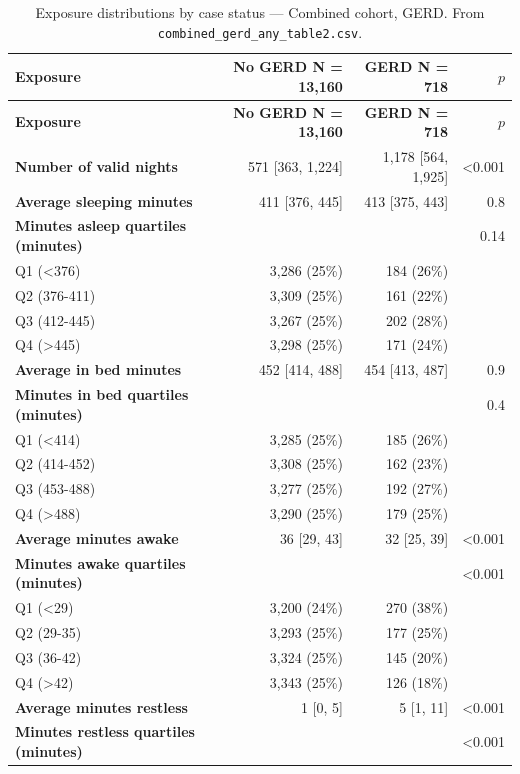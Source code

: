 \documentclass[11pt]{article}
\newcommand{\code}[1]{\texttt{\small #1}}
\begin{document}
\footnotesize\begin{longtable}{@{}p{6.4cm}rrr@{}}
\caption{Exposure distributions by case status --- Combined cohort, GERD. From \code{combined\_gerd\_any\_table2.csv}.}\label{tab:appM-t2-combined-gerd-any}\\
\toprule \textbf{Exposure} & \textbf{No GERD     N = 13,160} & \textbf{GERD     N = 718} & \textbf{$p$} \\ \midrule \endfirsthead
\toprule \textbf{Exposure} & \textbf{No GERD     N = 13,160} & \textbf{GERD     N = 718} & \textbf{$p$} \\ \midrule \endhead
\textbf{Number of valid nights} & 571 [363, 1,224] & 1,178 [564, 1,925] & <0.001 \\
\textbf{Average sleeping minutes} & 411 [376, 445] & 413 [375, 443] & 0.8 \\
\textbf{Minutes asleep quartiles (minutes)} &  &  & 0.14 \\
\quad Q1 (<376) & 3,286 (25\%) & 184 (26\%) &  \\
\quad Q2 (376-411) & 3,309 (25\%) & 161 (22\%) &  \\
\quad Q3 (412-445) & 3,267 (25\%) & 202 (28\%) &  \\
\quad Q4 (>445) & 3,298 (25\%) & 171 (24\%) &  \\
\textbf{Average in bed minutes} & 452 [414, 488] & 454 [413, 487] & 0.9 \\
\textbf{Minutes in bed quartiles (minutes)} &  &  & 0.4 \\
\quad Q1 (<414) & 3,285 (25\%) & 185 (26\%) &  \\
\quad Q2 (414-452) & 3,308 (25\%) & 162 (23\%) &  \\
\quad Q3 (453-488) & 3,277 (25\%) & 192 (27\%) &  \\
\quad Q4 (>488) & 3,290 (25\%) & 179 (25\%) &  \\
\textbf{Average minutes awake} & 36 [29, 43] & 32 [25, 39] & <0.001 \\
\textbf{Minutes awake quartiles (minutes)} &  &  & <0.001 \\
\quad Q1 (<29) & 3,200 (24\%) & 270 (38\%) &  \\
\quad Q2 (29-35) & 3,293 (25\%) & 177 (25\%) &  \\
\quad Q3 (36-42) & 3,324 (25\%) & 145 (20\%) &  \\
\quad Q4 (>42) & 3,343 (25\%) & 126 (18\%) &  \\
\textbf{Average minutes restless} & 1 [0, 5] & 5 [1, 11] & <0.001 \\
\textbf{Minutes restless quartiles (minutes)} &  &  & <0.001 \\

\end{longtable}
\end{document}
